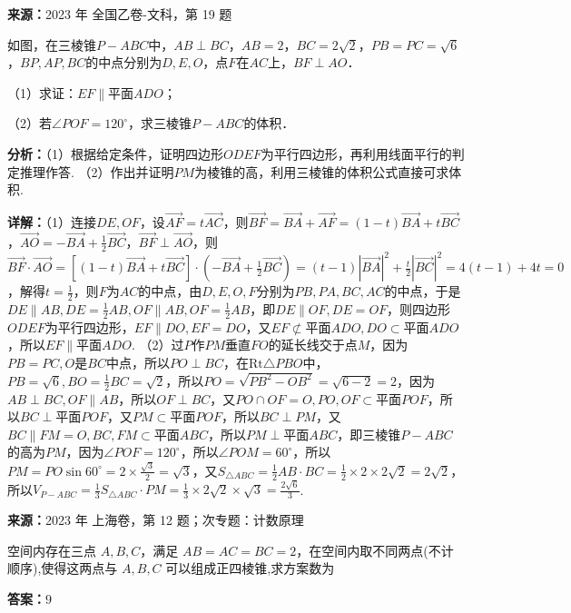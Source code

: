 \begin{question}[points=12]
\textbf{来源：}2023 年 全国乙卷-文科，第 19 题\par
如图，在三棱锥$P-ABC$中，$AB\perp BC$，$AB=2$，$BC=2\sqrt{2}$，$PB=PC=\sqrt{6}$，$BP, AP, BC$的中点分别为$D, E, O$，点$F$在$AC$上，$BF\perp AO$．

（1）求证：$EF\parallel$平面$ADO$；

（2）若$\angle POF=120^\circ$，求三棱锥$P-ABC$的体积．
\begin{solution}

\textbf{分析：}（1）根据给定条件，证明四边形$ODEF$为平行四边形，再利用线面平行的判定推理作答.
（2）作出并证明$PM$为棱锥的高，利用三棱锥的体积公式直接可求体积.

\textbf{详解：}（1）连接$DE, OF$，设$\overrightarrow{AF}=t\overrightarrow{AC}$，则$\overrightarrow{BF}=\overrightarrow{BA}+\overrightarrow{AF}=(1-t)\overrightarrow{BA}+t\overrightarrow{BC}$，$\overrightarrow{AO}=-\overrightarrow{BA}+\frac{1}{2}\overrightarrow{BC}$，$\overrightarrow{BF}\perp\overrightarrow{AO}$，则$\overrightarrow{BF}\cdot\overrightarrow{AO}=[(1-t)\overrightarrow{BA}+t\overrightarrow{BC}]\cdot(-\overrightarrow{BA}+\frac{1}{2}\overrightarrow{BC})=(t-1)|\overrightarrow{BA}|^2+\frac{t}{2}|\overrightarrow{BC}|^2=4(t-1)+4t=0$，解得$t=\frac{1}{2}$，则$F$为$AC$的中点，由$D,E,O,F$分别为$PB,PA,BC,AC$的中点，于是$DE\parallel AB, DE=\frac{1}{2}AB, OF\parallel AB, OF=\frac{1}{2}AB$，即$DE\parallel OF, DE=OF$，则四边形$ODEF$为平行四边形，$EF\parallel DO, EF=DO$，又$EF\not\subset$平面$ADO, DO\subset$平面$ADO$，所以$EF\parallel$平面$ADO$.
（2）过$P$作$PM$垂直$FO$的延长线交于点$M$，因为$PB=PC, O$是$BC$中点，所以$PO\perp BC$，在$\mathrm{Rt}\triangle PBO$中，$PB=\sqrt{6}, BO=\frac{1}{2}BC=\sqrt{2}$，所以$PO=\sqrt{PB^2-OB^2}=\sqrt{6-2}=2$，因为$AB\perp BC, OF\parallel AB$，所以$OF\perp BC$，又$PO\cap OF=O, PO,OF\subset$平面$POF$，所以$BC\perp$平面$POF$，又$PM\subset$平面$POF$，所以$BC\perp PM$，又$BC\parallel FM=O, BC,FM\subset$平面$ABC$，所以$PM\perp$平面$ABC$，即三棱锥$P-ABC$的高为$PM$，因为$\angle POF=120^\circ$，所以$\angle POM=60^\circ$，所以$PM=PO\sin60^\circ=2\times\frac{\sqrt{3}}{2}=\sqrt{3}$，又$S_{\triangle ABC}=\frac{1}{2}AB\cdot BC=\frac{1}{2}\times2\times2\sqrt{2}=2\sqrt{2}$，所以$V_{P-ABC}=\frac{1}{3}S_{\triangle ABC}\cdot PM=\frac{1}{3}\times2\sqrt{2}\times\sqrt{3}=\frac{2\sqrt{6}}{3}$.
\end{solution}
\end{question}

\begin{question}[points=5]
\textbf{来源：}2023 年 上海卷，第 12 题；次专题：计数原理\par
空间内存在三点 $A,B,C$，满足 $AB=AC=BC=2$，在空间内取不同两点(不计顺序),使得这两点与 $A,B,C$ 可以组成正四棱锥,求方案数为
\fillin[{$9$}]
\begin{solution}
\textbf{答案：}$9$
\end{solution}
\end{question}

